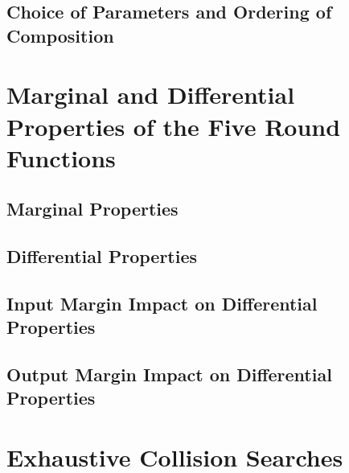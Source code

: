 \documentclass[10pt,twocolumn,twoside]{pnas-new}
\begin{document}


\subsection{Choice of Parameters and Ordering of Composition} \label{sec:p:generalizations}


\section{Marginal and Differential Properties of the Five Round Functions} \label{sec:differentials}


\subsection{Marginal Properties} \label{sec:d:margin}




\subsection{Differential Properties} \label{sec:d:diff}


\subsection{Input Margin Impact on Differential Properties} \label{sec:d:input}


\subsection{Output Margin Impact on Differential Properties} \label{sec:d:output}



\section{Exhaustive Collision Searches} \label{sec:search}
\end{document}
